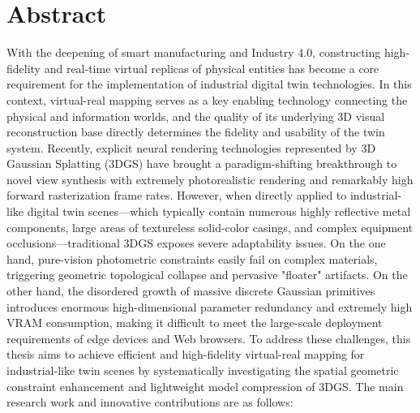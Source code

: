 \clearpage
\chapter*{Abstract}

With the deepening of smart manufacturing and Industry 4.0, constructing high-fidelity and real-time virtual replicas of physical entities has become a core requirement for the implementation of industrial digital twin technologies. In this context, virtual-real mapping serves as a key enabling technology connecting the physical and information worlds, and the quality of its underlying 3D visual reconstruction base directly determines the fidelity and usability of the twin system. Recently, explicit neural rendering technologies represented by 3D Gaussian Splatting (3DGS) have brought a paradigm-shifting breakthrough to novel view synthesis with extremely photorealistic rendering and remarkably high forward rasterization frame rates. However, when directly applied to industrial-like digital twin scenes—which typically contain numerous highly reflective metal components, large areas of textureless solid-color casings, and complex equipment occlusions—traditional 3DGS exposes severe adaptability issues. On the one hand, pure-vision photometric constraints easily fail on complex materials, triggering geometric topological collapse and pervasive "floater" artifacts. On the other hand, the disordered growth of massive discrete Gaussian primitives introduces enormous high-dimensional parameter redundancy and extremely high VRAM consumption, making it difficult to meet the large-scale deployment requirements of edge devices and Web browsers. To address these challenges, this thesis aims to achieve efficient and high-fidelity virtual-real mapping for industrial-like twin scenes by systematically investigating the spatial geometric constraint enhancement and lightweight model compression of 3DGS. The main research work and innovative contributions are as follows:


